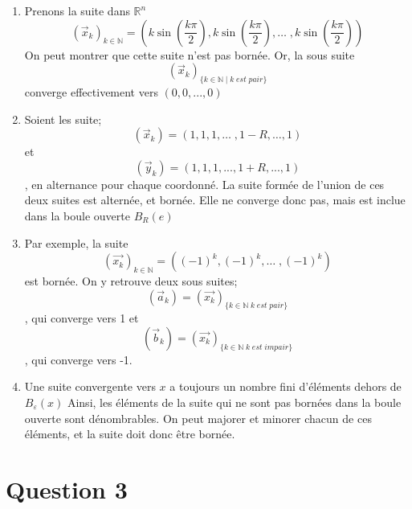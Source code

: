 \documentclass[letterpaper,12pt,oneside,final]{book}
\begin{document}
\begin{enumerate}[1)]

\item %
Prenons la suite dans $\mathbb{R}^{n}$
\[
\left( \vec{x}_k \right)_{k\in \mathbb{N}} = \left(k \sin\left(\frac{k\pi}{2} \right), k \sin\left(\frac{k\pi}{2} \right), \ldots\;,k \sin\left(\frac{k\pi}{2} \right)  \right) 
\]
On peut montrer que cette suite n'est pas bornée. Or, la sous suite
\[ 
    \left( \vec{x}_k \right)_{\{k \in \mathbb{N}\; | \;k\;est\;pair\}}
\] converge effectivement vers $(0, 0, ... , 0)$
\item %
Soient les suite;
\[
(\vec{x}_k) = (1,1,1, \ldots\;, 1 - R,\ldots , 1)
\] et \[(\vec{y}_k) = (1, 1, 1, ..., 1 + R, ..., 1)\]
, en alternance pour chaque coordonné. La suite formée de l'union de ces deux suites est alternée, et bornée.
Elle ne converge donc pas, mais est inclue dans la boule ouverte $B_R(e)$

\item %
Par exemple, la suite 
\[
\left( \vec{x_k} \right)_{k\in \mathbb{N}} = ((-1)^{k}, (-1)^k, \ldots\;, (-1)^{k}) 
\]
est bornée. On y retrouve deux sous suites;
\[
    \left( \vec{a}_k \right) = \left( \vec{x_k} \right)_{\{k\in \mathbb{N} \; k\;est\;pair\}}
\], qui converge vers 1 et 
 \[
    \left( \vec{b}_k \right) = \left( \vec{x_k} \right)_{\{k\in \mathbb{N} \; k\;est\;impair\}}
\], qui converge vers -1.
\item Une suite convergente vers $x$ a toujours un nombre fini d'éléments dehors de $B_{\varepsilon}(x)$ 
Ainsi, les éléments de la suite qui ne sont pas bornées dans la boule ouverte sont dénombrables. On peut majorer et minorer chacun de ces éléments,
et la suite doit donc être bornée.
\end{enumerate}

\newpage
\section*{Question 3}
\end{document}
